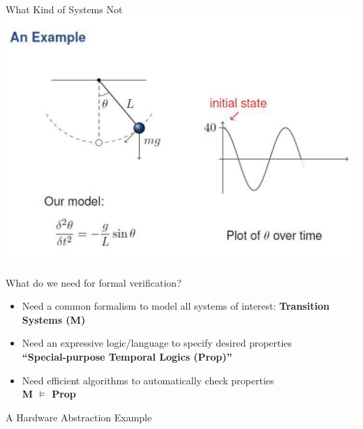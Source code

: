\documentclass{beamer}
\begin{document}
\begin{frame}{What Kind of Systems Not} 
\includegraphics[scale=0.3]{pics/contdynamics.png}
\end{frame}

\begin{frame}{What do we need for formal verification?}
\begin{itemize}
\item<1-> Need a common formalism to model all systems of interest:
\textbf{Transition Systems (M)}

\item<2-> Need an expressive logic/language to specify desired properties \\
\textbf{``Special-purpose Temporal Logics (Prop)''}

\item<3-> Need efficient algorithms to automatically check properties \\
\textbf{M $\models$ Prop}
\end{itemize}
\end{frame}

\begin{frame}{A Hardware Abstraction Example}
\end{frame}
\end{document}
